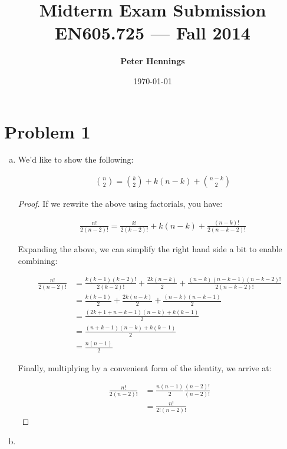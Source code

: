 \documentclass[11pt]{article}
\title{\bf Midterm Exam Submission\\[2ex] 
       \rm\normalsize EN605.725 --- Fall 2014}
\date{\today}
\author{\bf Peter Hennings}
\begin{document}
\maketitle

\section*{Problem 1} 

\begin{enumerate}[(a)]

\item We'd like to show the following:

\begin{align*}
& {n \choose 2} = {k \choose 2} + k(n-k) + {n-k \choose 2}
\end{align*}

\begin{proof}

If we rewrite the above using factorials, you have:

\begin{align*}
& \frac{n!}{2(n-2)!} = \frac{k!}{2(k-2)!} + k(n-k) + \frac{(n-k)!}{2(n-k-2)!}
\end{align*}

Expanding the above, we can simplify the right hand side a bit to enable combining:

\begin{align*}
\frac{n!}{2(n-2)!} &= \frac{k(k-1)(k-2)!}{2(k-2)!} + \frac{2k(n-k)}{2} + \frac{(n-k)(n-k-1)(n-k-2)!}{2(n-k-2)!} \\
&= \frac{k(k-1)}{2} + \frac{2k(n-k)}{2} + \frac{(n-k)(n-k-1)}{2} \\
&= \frac{(2k+1+n-k-1)(n-k) + k(k-1)}{2} \\
&= \frac{(n+k-1)(n-k) + k(k-1)}{2} \\
&= \frac{n(n-1)}{2}
\end{align*}

Finally, multiplying by a convenient form of the identity, we arrive at:

\begin{align*}
\frac{n!}{2(n-2)!} &= \frac{n(n-1)}{2} \frac{(n-2)!}{(n-2)!} \\
&= \frac{n!}{2!(n-2)!}
\end{align*}

\end{proof}

\item

\end{enumerate}
\end{document}
